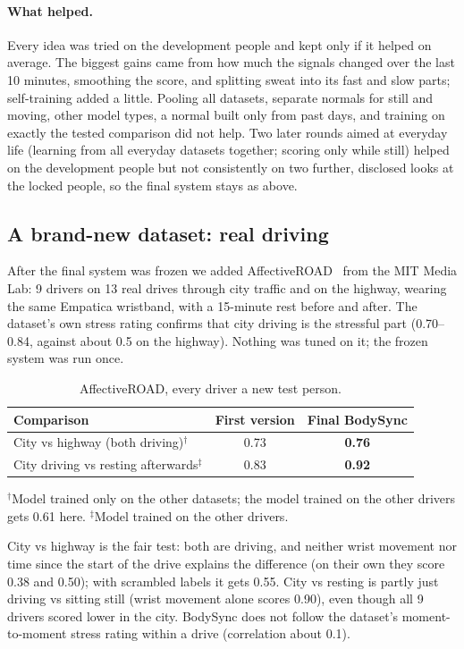 \documentclass{article}
\begin{document}
\paragraph{What helped.} Every idea was tried on the development people and kept only if it helped on average. The biggest gains came from how much the signals changed over the last 10 minutes, smoothing the score, and splitting sweat into its fast and slow parts; self-training added a little. Pooling all datasets, separate normals for still and moving, other model types, a normal built only from past days, and training on exactly the tested comparison did not help. Two later rounds aimed at everyday life (learning from all everyday datasets together; scoring only while still) helped on the development people but not consistently on two further, disclosed looks at the locked people, so the final system stays as above.

\subsection*{A brand-new dataset: real driving}

After the final system was frozen we added AffectiveROAD~\cite{affectiveroad} from the MIT Media Lab: 9 drivers on 13 real drives through city traffic and on the highway, wearing the same Empatica wristband, with a 15-minute rest before and after. The dataset's own stress rating confirms that city driving is the stressful part (0.70--0.84, against about 0.5 on the highway). Nothing was tuned on it; the frozen system was run once.

\begin{table}[H]
\centering
\caption{AffectiveROAD, every driver a new test person.}
\begin{tabular}{lcc}
\toprule
Comparison & First version & Final BodySync \\
\midrule
City vs highway (both driving)$^\dagger$ & 0.73 & \textbf{0.76} \\
City driving vs resting afterwards$^\ddagger$ & 0.83 & \textbf{0.92} \\
\bottomrule
\end{tabular}

\smallskip
\footnotesize $^\dagger$Model trained only on the other datasets; the model trained on the other drivers gets 0.61 here. $^\ddagger$Model trained on the other drivers.
\end{table}

City vs highway is the fair test: both are driving, and neither wrist movement nor time since the start of the drive explains the difference (on their own they score 0.38 and 0.50); with scrambled labels it gets 0.55. City vs resting is partly just driving vs sitting still (wrist movement alone scores 0.90), even though all 9 drivers scored lower in the city. BodySync does not follow the dataset's moment-to-moment stress rating within a drive (correlation about 0.1).
\end{document}
